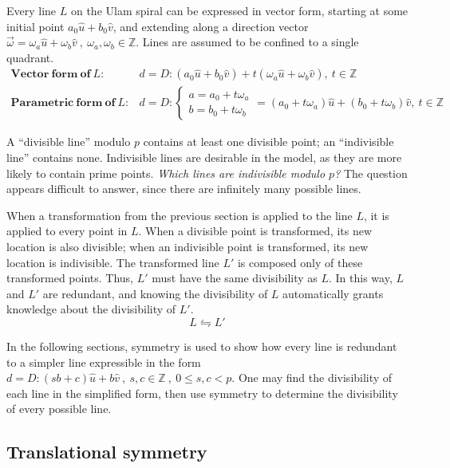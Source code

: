 \documentclass{article}
\begin{document}
Every line \(L\) on the Ulam spiral can be expressed in vector form, starting at some initial point \(a_0\hat{u}+b_0\hat{v}\), and extending along a direction vector \(\vec{\omega}=\omega_a\hat{u}+\omega_b\hat{v}\ ,\ \omega_a,\omega_b \in \mathbb{Z}\). Lines are assumed to be confined to a single quadrant.
\begin{align}
	\nonumber \mathbf{Vector\ form\ of}\ L:&d=D:(a_0\hat{u}+b_0\hat{v})+t(\omega_a\hat{u}+\omega_b\hat{v}),\ t \in \mathbb{Z} \\
	\nonumber \mathbf{Parametric\ form\ of}\ L:&d=D:\begin{cases}
										   a=a_0+t\omega_a \\
										   b=b_0+t\omega_b
										   \end{cases} = (a_0+t\omega_a)\hat{u} + (b_0+t\omega_b)\hat{v},\ t \in \mathbb{Z}
\end{align}

A ``divisible line'' modulo \(p\) contains at least one divisible point; an ``indivisible line'' contains none. Indivisible lines are desirable in the model, as they are more likely to contain prime points. \textit{Which lines are indivisible modulo \(p\)?} The question appears difficult to answer, since there are infinitely many possible lines.

When a transformation from the previous section is applied to the line \(L\), it is applied to every point in \(L\). When a divisible point is transformed, its new location is also divisible; when an indivisible point is transformed, its new location is indivisible. The transformed line \(L'\) is composed only of these transformed points. Thus, \(L'\) must have the same divisibility as \(L\). In this way, \(L\) and \(L'\) are redundant, and knowing the divisibility of \(L\) automatically grants knowledge about the divisibility of \(L'\).
	\[L \leftrightharpoons L'\]

In the following sections, symmetry is used to show how every line is redundant to a simpler line expressible in the form \(d=D:(sb+c)\hat{u}+b\hat{v}\ ,\ s,c \in \mathbb{Z}\ ,\ 0 \leq s,c < p\). One may find the divisibility of each line in the simplified form, then use symmetry to determine the divisibility of every possible line.


\subsection{Translational symmetry}
\end{document}
